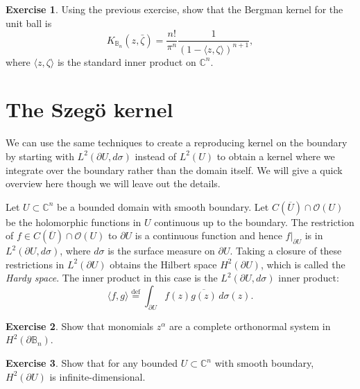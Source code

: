 \documentclass[12pt,openany]{book}
\newcommand{\linnprod}[2]{\langle #1 , #2 \rangle}
\newcommand{\C}{{\mathbb{C}}}
\newcommand{\bB}{{\mathbb{B}}}
\newcommand{\sO}{{\mathscr{O}}}
\newcommand{\myindex}[1]{#1\index{#1}}
\theoremstyle{plain}
\theoremstyle{remark}
\theoremstyle{definition}
\newenvironment{exbox}{%
    \def\FrameCommand{\vrule width 1pt \relax\hspace {10pt}}%
    \MakeFramed {\advance \hsize -\width \FrameRestore }%
}{%
    \endMakeFramed
}
\theoremstyle{exercise}
\newtheorem{exercise}{Exercise}[section]
\theoremstyle{example}
\begin{document}
\begin{exbox}
\begin{exercise}
Using the previous exercise, show that the Bergman kernel for the unit ball
is
\begin{equation*}
K_{\bB_n}(z,\bar{\zeta}) =
\frac{n!}{\pi^n}\frac{1}{{(1-\linnprod{z}{\zeta})}^{n+1}},
\end{equation*}
where $\linnprod{z}{\zeta}$ is the standard inner product on $\C^n$.
\end{exercise}
\end{exbox}


\section{The Szeg{\"o} kernel}

We can use the same techniques to create a reproducing kernel on the
boundary by starting with $L^2(\partial U, d\sigma)$ instead of $L^2(U)$ to obtain a
kernel where we integrate over the boundary rather than the domain itself.
We will give a quick overview here though we will leave out the details.

Let $U \subset \C^n$ be a bounded domain with smooth boundary.  Let
$C(\overline{U}) \cap \sO(U)$ be the holomorphic functions in $U$
continuous up to the boundary.  The restriction of
$f \in C(\overline{U}) \cap \sO(U)$ to $\partial U$ is a continuous function
and hence $f|_{\partial U}$ is in $L^2(\partial U,d\sigma)$, where $d\sigma$
is the surface measure on $\partial U$.  Taking a closure
of these restrictions in $L^2(\partial U)$ obtains the Hilbert space
$H^2(\partial U)$,
which is called the \emph{\myindex{Hardy space}}.
The inner product in this case is the $L^2(\partial U,
d\sigma)$ inner product:
\begin{equation*}
\linnprod{f}{g} \overset{\text{def}}{=} \int_{\partial U} f(z)
\overline{g(z)} \, d\sigma(z) .
\end{equation*}

\begin{exbox}
\begin{exercise}
Show that monomials $z^\alpha$ are a complete orthonormal system in
$H^2(\partial \bB_n)$.
\end{exercise}

\begin{exercise}
Show that for any bounded $U \subset \C^n$ with smooth boundary,
$H^2(\partial U)$ is infinite-dimensional.
\end{exercise}
\end{exbox}
\end{document}
